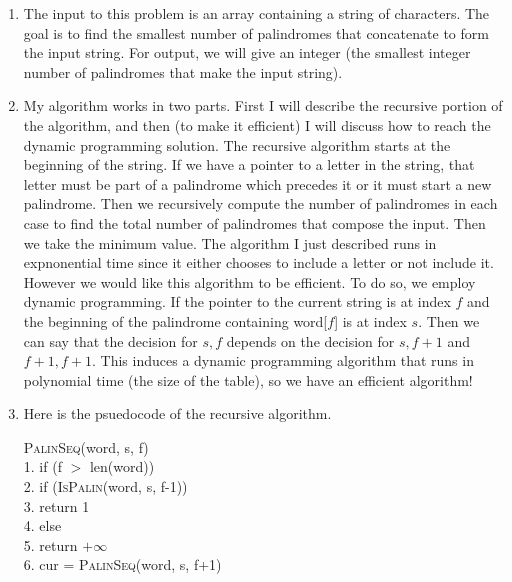 \documentclass{article}
\begin{document}
\begin{enumerate}
    \item The input to this problem is an array containing a string of characters.
    The goal is to find the smallest number of palindromes that concatenate to form the input string.
    For output, we will give an integer (the smallest integer number of palindromes that make the input string).
    \item My algorithm works in two parts.
    First I will describe the recursive portion of the algorithm, and then (to make it efficient) I will discuss how to reach the dynamic programming solution.
    The recursive algorithm starts at the beginning of the string.
    If we have a pointer to a letter in the string, that letter must be part of a palindrome which precedes it or it must start a new palindrome.
    Then we recursively compute the number of palindromes in each case to find the total number of palindromes that compose the input.
    Then we take the minimum value. \parspace
    The algorithm I just described runs in expnonential time since it either chooses to include a letter or not include it.
    However we would like this algorithm to be efficient.
    To do so, we employ dynamic programming.
    If the pointer to the current string is at index $f$ and the beginning of the palindrome containing word[$f$] is at index $s$.
    Then we can say that the decision for $s,f$ depends on the decision for $s,f+1$ and $f+1,f+1$.
    This induces a dynamic programming algorithm that runs in polynomial time (the size of the table), so we have an efficient algorithm!
    \item Here is the psuedocode of the recursive algorithm.
    \begin{algorithm}
        \textsc{PalinSeq}(word, s, f) \\
        1. \hspace{1em} if (f $>$ len(word)) \\
        2. \hspace{2em}     if (\textsc{IsPalin}(word, s, f-1)) \\
        3. \hspace{3em}         return 1 \\
        4. \hspace{2em}     else \\
        5. \hspace{3em}         return $+\infty$ \\
        6. \hspace{1em} cur = \textsc{PalinSeq}(word, s, f+1) \\

\end{algorithm}
\end{enumerate}
\end{document}
